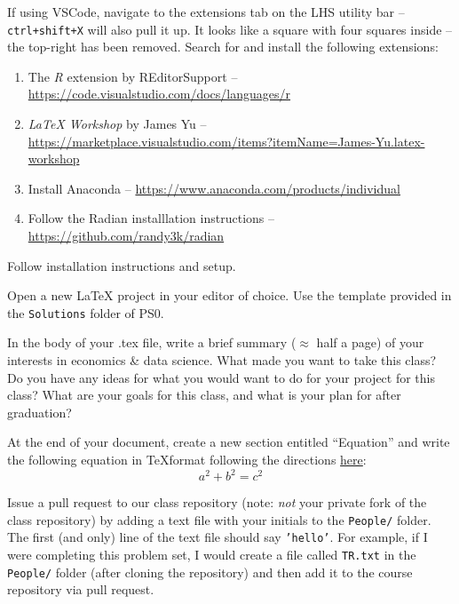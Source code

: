 \documentclass[12pt,english]{exam}
\begin{document}
\begin{questions}
If using VSCode, navigate to the extensions tab on the LHS utility bar -- \texttt{ctrl+shift+X} will also pull it up. It looks like a square with four squares inside -- the top-right has been removed. Search for and install the following extensions:

\begin{enumerate}
    \item The \textit{R} extension by REditorSupport -- \url{https://code.visualstudio.com/docs/languages/r}
  \item \textit{LaTeX Workshop} by James Yu -- \url{https://marketplace.visualstudio.com/items?itemName=James-Yu.latex-workshop}
  \item Install Anaconda -- \url{https://www.anaconda.com/products/individual}
  \item Follow the Radian installlation instructions -- \url{https://github.com/randy3k/radian}
\end{enumerate}

Follow installation instructions and setup. 

\question Open a new LaTeX project in your editor of choice. Use the template provided in the \texttt{Solutions} folder of PS0.

\question In the body of your .tex file, write a brief summary ($\approx$ half a page) of your interests in economics \& data science. What made you want to take this class? Do you have any ideas for what you would want to do for your project for this class? What are your goals for this class, and what is your plan for after graduation?

\question At the end of your document, create a new section entitled ``Equation'' and write the following equation in \TeX format following the directions \href{https://www.overleaf.com/learn/latex/mathematical_expressions}{here}:
\begin{equation}
	a^{2} + b^{2} = c^{2}
\end{equation}


\question Issue a pull request to our class repository (note: \emph{not} your private fork of the class repository) by adding a text file with your initials to the \texttt{People/} folder. The first (and only) line of the text file should say \texttt{'hello'}. For example, if I were completing this problem set, I would create a file called \texttt{TR.txt} in the \texttt{People/} folder (after cloning the repository) and then add it to the course repository via pull request.

\end{questions}
\end{document}
